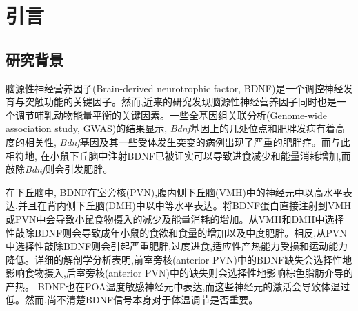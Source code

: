 \chapter{引言}\label{chap:introduction}

\section{研究背景}
脑源性神经营养因子(Brain-derived neurotrophic factor, BDNF)是一个调控神经发育与突触功能的关键因子。然而,近来的研究发现脑源性神经营养因子同时也是一个调节哺乳动物能量平衡的关键因素\citep{xu2016neurotrophic}。一些全基因组关联分析(Genome-wide association study, GWAS)的结果显示, \textit{Bdnf}基因上的几处位点和肥胖发病有着高度的相关性\citep{thorleifsson2009genome,speliotes2010association,wen2012meta}, \textit{Bdnf}基因及其一些受体发生突变的病例出现了严重的肥胖症\citep{gray2006hyperphagia}。而与此相符地, 在小鼠下丘脑中注射BDNF已被证实可以导致进食减少和能量消耗增加\citep{wang2007abrain,wang2007bbrain,wang2010brain,godar2011reduction},而敲除\textit{Bdnf}则会引发肥胖\citep{xu2003brain, unger2007selective, liao2012dendritically}。

在下丘脑中, BDNF在室旁核(PVN),腹内侧下丘脑(VMH)中的神经元中以高水平表达,并且在背内侧下丘脑(DMH)中以中等水平表达\citep{xu2003brain, unger2007selective,liao2012dendritically,an2015discrete}。将BDNF蛋白直接注射到VMH或PVN中会导致小鼠食物摄入的减少及能量消耗的增加\citep{wang2007abrain,wang2007bbrain,godar2011reduction}。从VMH和DMH中选择性敲除BDNF则会导致成年小鼠的食欲和食量的增加以及中度肥胖\citep{unger2007selective}。相反,从PVN中选择性敲除BDNF则会引起严重肥胖,过度进食,适应性产热能力受损和运动能力降低\citep{an2015discrete}。详细的解剖学分析表明,前室旁核(anterior PVN)中的BDNF缺失会选择性地影响食物摄入,后室旁核(anterior PVN)中的缺失则会选择性地影响棕色脂肪介导的产热\citep{an2015discrete}。 BDNF也在POA温度敏感神经元中表达\citep{tan2016warm,zhao2017hypothalamic},而这些神经元的激活会导致体温过低\citep{tan2016warm}。然而,尚不清楚BDNF信号本身对于体温调节是否重要。

